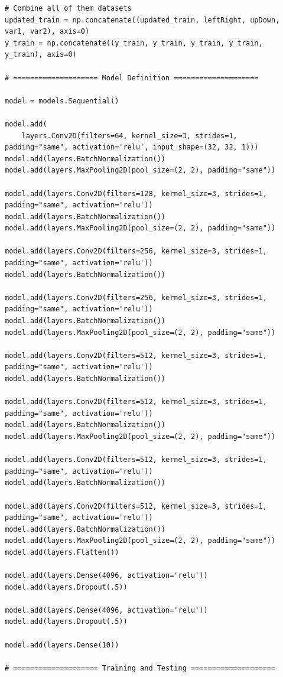 \documentclass{article}
\begin{document}
\begin{titlepage}
\begin{lstlisting}
# Combine all of them datasets
updated_train = np.concatenate((updated_train, leftRight, upDown, var1, var2), axis=0)
y_train = np.concatenate((y_train, y_train, y_train, y_train, y_train), axis=0)

# ==================== Model Definition ====================

model = models.Sequential()

model.add(
    layers.Conv2D(filters=64, kernel_size=3, strides=1, padding="same", activation='relu', input_shape=(32, 32, 1)))
model.add(layers.BatchNormalization())
model.add(layers.MaxPooling2D(pool_size=(2, 2), padding="same"))

model.add(layers.Conv2D(filters=128, kernel_size=3, strides=1, padding="same", activation='relu'))
model.add(layers.BatchNormalization())
model.add(layers.MaxPooling2D(pool_size=(2, 2), padding="same"))

model.add(layers.Conv2D(filters=256, kernel_size=3, strides=1, padding="same", activation='relu'))
model.add(layers.BatchNormalization())

model.add(layers.Conv2D(filters=256, kernel_size=3, strides=1, padding="same", activation='relu'))
model.add(layers.BatchNormalization())
model.add(layers.MaxPooling2D(pool_size=(2, 2), padding="same"))

model.add(layers.Conv2D(filters=512, kernel_size=3, strides=1, padding="same", activation='relu'))
model.add(layers.BatchNormalization())

model.add(layers.Conv2D(filters=512, kernel_size=3, strides=1, padding="same", activation='relu'))
model.add(layers.BatchNormalization())
model.add(layers.MaxPooling2D(pool_size=(2, 2), padding="same"))

model.add(layers.Conv2D(filters=512, kernel_size=3, strides=1, padding="same", activation='relu'))
model.add(layers.BatchNormalization())

model.add(layers.Conv2D(filters=512, kernel_size=3, strides=1, padding="same", activation='relu'))
model.add(layers.BatchNormalization())
model.add(layers.MaxPooling2D(pool_size=(2, 2), padding="same"))
model.add(layers.Flatten())

model.add(layers.Dense(4096, activation='relu'))
model.add(layers.Dropout(.5))

model.add(layers.Dense(4096, activation='relu'))
model.add(layers.Dropout(.5))

model.add(layers.Dense(10))

# ==================== Training and Testing ====================


\end{lstlisting}
\end{titlepage}
\end{document}
